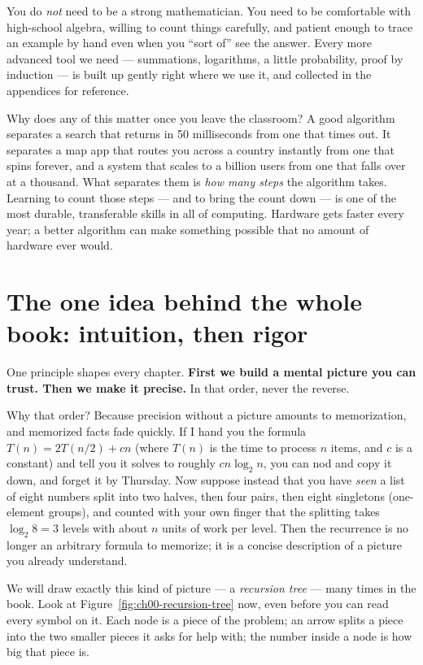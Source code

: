 You do \emph{not} need to be a strong mathematician. You need to be comfortable
with high-school algebra, willing to count things carefully, and patient enough
to trace an example by hand even when you ``sort of'' see the answer. Every more
advanced tool we need --- summations, logarithms, a little probability, proof by
induction --- is built up gently right where we use it, and collected in the
appendices for reference.

\begin{aestheticbox}
Why does any of this matter once you leave the classroom? A good algorithm
separates a search that returns in 50 milliseconds from one that times out. It
separates a map app that routes you across a country instantly from one that
spins forever, and a system that scales to a billion users from one that falls
over at a thousand.
What separates them is \emph{how many steps} the algorithm takes. Learning
to count those steps --- and to bring the count down --- is
one of the most durable, transferable skills in all of computing. Hardware gets
faster every year; a better algorithm can make something possible that no amount
of hardware ever would.
\end{aestheticbox}

\section*{The one idea behind the whole book: intuition, then rigor}

One principle shapes every chapter. \textbf{First we build a
mental picture you can trust. Then we make it precise.} In that order, never the
reverse.

Why that order? Because precision without a picture amounts to memorization,
and memorized facts fade quickly. If I hand you the formula
$T(n) = 2T(n/2) + c n$ (where $T(n)$ is the time to process $n$ items, and $c$ is a constant) and tell you it solves to roughly $c n \log_2 n$, you
can nod and copy it down, and forget it by Thursday. Now suppose instead that
you have \emph{seen} a list of eight numbers split into two halves, then four
pairs, then eight singletons (one-element groups), and counted with your own finger that the
splitting takes $\log_2 8 = 3$ levels with about $n$ units of work per level.
Then the recurrence is no longer an arbitrary formula to memorize; it is a
concise description of a picture you already understand.

We will draw exactly this kind of picture --- a \emph{recursion tree} --- many
times in the book. Look at Figure~\ref{fig:ch00-recursion-tree} now, even before you can read every
symbol on it. Each node is a piece of the problem; an arrow splits a piece into
the two smaller pieces it asks for help with; the number inside a node is how big
that piece is.

